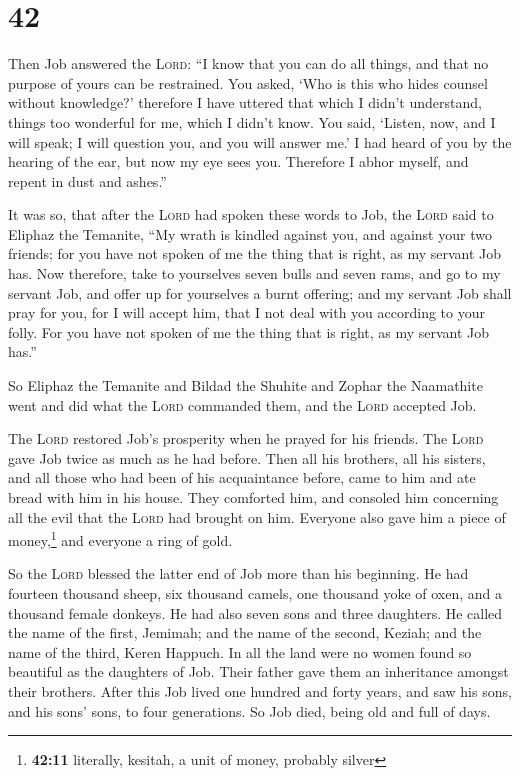 \hypertarget{section-41}{%
\section{42}\label{section-41}}

 Then Job answered the \textsc{Lord}:  ``I
know that you can do all things, and that no purpose of yours can be
restrained.  You asked, `Who is this who hides counsel
without knowledge?' therefore I have uttered that which I didn't
understand, things too wonderful for me, which I didn't know.
 You said, `Listen, now, and I will speak; I will question
you, and you will answer me.'  I had heard of you by the
hearing of the ear, but now my eye sees you.  Therefore I
abhor myself, and repent in dust and ashes.''

 It was so, that after the \textsc{Lord} had spoken these
words to Job, the \textsc{Lord} said to Eliphaz the Temanite, ``My wrath
is kindled against you, and against your two friends; for you have not
spoken of me the thing that is right, as my servant Job has.
 Now therefore, take to yourselves seven bulls and seven
rams, and go to my servant Job, and offer up for yourselves a burnt
offering; and my servant Job shall pray for you, for I will accept him,
that I not deal with you according to your folly. For you have not
spoken of me the thing that is right, as my servant Job has.''

 So Eliphaz the Temanite and Bildad the Shuhite and Zophar
the Naamathite went and did what the \textsc{Lord} commanded them, and
the \textsc{Lord} accepted Job.

 The \textsc{Lord} restored Job's prosperity when he
prayed for his friends. The \textsc{Lord} gave Job twice as much as he
had before.  Then all his brothers, all his sisters, and
all those who had been of his acquaintance before, came to him and ate
bread with him in his house. They comforted him, and consoled him
concerning all the evil that the \textsc{Lord} had brought on him.
Everyone also gave him a piece of money,\footnote{\textbf{42:11}
  literally, kesitah, a unit of money, probably silver} and everyone a
ring of gold.

 So the \textsc{Lord} blessed the latter end of Job more
than his beginning. He had fourteen thousand sheep, six thousand camels,
one thousand yoke of oxen, and a thousand female donkeys.
 He had also seven sons and three daughters.
 He called the name of the first, Jemimah; and the name
of the second, Keziah; and the name of the third, Keren Happuch.
 In all the land were no women found so beautiful as the
daughters of Job. Their father gave them an inheritance amongst their
brothers.  After this Job lived one hundred and forty
years, and saw his sons, and his sons' sons, to four generations.
 So Job died, being old and full of days.
